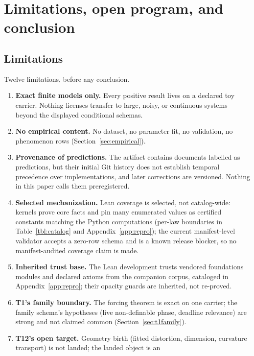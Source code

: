\section{Limitations, open program, and conclusion}
\label{sec:limits}

\subsection{Limitations}
\label{sec:limitations}

Twelve limitations, before any conclusion.

\begin{enumerate}
\item \textbf{Exact finite models only.} Every positive result lives on a
declared toy carrier. Nothing licenses transfer to large, noisy, or
continuous systems beyond the displayed conditional schemas.
\item \textbf{No empirical content.} No dataset, no parameter fit, no
validation, no phenomenon rows (Section~\ref{sec:empirical}).
\item \textbf{Provenance of predictions.} The artifact contains documents
labelled as predictions, but their initial Git history does not establish
temporal precedence over implementations, and later corrections are
versioned. Nothing in this paper calls them preregistered.
\item \textbf{Selected mechanization.} Lean coverage is selected, not
catalog-wide: kernels prove core facts and pin many enumerated values as
certified constants matching the Python computations (per-law boundaries in
Table~\ref{tbl:catalog} and Appendix~\ref{app:repro}); the current
manifest-level validator accepts a zero-row schema and is a known release
blocker, so no manifest-audited coverage claim is made.
\item \textbf{Inherited trust base.} The Lean development trusts vendored
foundations modules and declared axioms from the companion corpus, cataloged
in Appendix~\ref{app:repro}; their opacity guards are inherited, not
re-proved.
\item \textbf{T1's family boundary.} The forcing theorem is exact on one
carrier; the family schema's hypotheses (live non-definable phase, deadline
relevance) are strong and not claimed common (Section~\ref{sec:t1family}).
\item \textbf{T12's open target.} Geometry birth (fitted distortion,
dimension, curvature transport) is not landed; the landed object is an

\end{enumerate}

